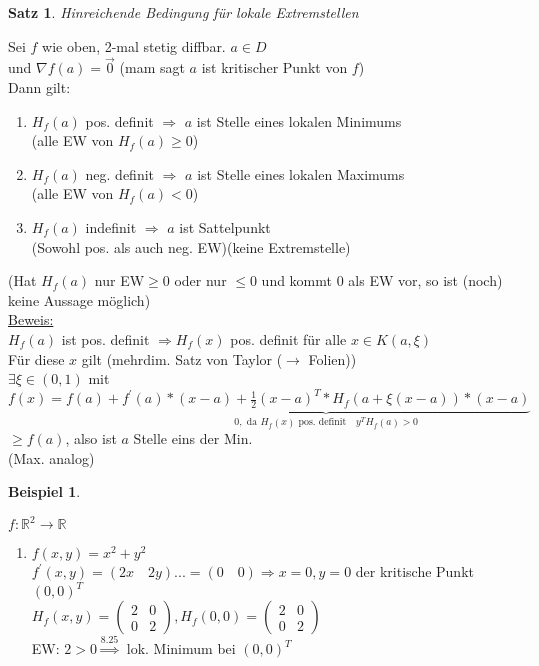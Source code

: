 \documentclass[a4paper,11pt]{article}
\newtheorem{satz}[definition]{Satz}
\newtheorem{bsp}[definition]{Beispiel}
\begin{document}
\begin{satz}
	Hinreichende Bedingung für lokale Extremstellen
\end{satz}
Sei $f$ wie oben, 2-mal stetig diffbar. $a\in D$ \\
und $\nabla f(a)=\overset{\rightarrow}{0}$ (mam sagt $a$ ist kritischer Punkt von $f$) \\
Dann gilt:
\begin{enumerate}[label=\alph*)]
	\item $H_f(a)$ pos. definit \hspace{15mm}$\Rightarrow$ $a$ ist Stelle eines lokalen Minimums \\
	(alle EW von $H_f(a)\geq0$)
	\item $H_f(a)$ neg. definit \hspace{15mm}$\Rightarrow$ $a$ ist Stelle eines lokalen Maximums \\
	(alle EW von $H_f(a)<0$)
	\item $H_f(a)$ indefinit \hspace{35mm}$\Rightarrow$ $a$ ist Sattelpunkt \\
	(Sowohl pos. als auch neg. EW)\hspace{13mm}(keine Extremstelle)
\end{enumerate}
(Hat $H_f(a)$ nur EW$\geq0$ oder nur $\leq0$ und kommt 0 als EW vor, so ist (noch) keine Aussage möglich) \\
\underline{Beweis:} \\
$H_f(a)$ ist pos. definit $\Rightarrow H_f(x)$ pos. definit für alle $x\in K(a,\xi)$ \\
Für diese $x$ gilt (mehrdim. Satz von Taylor ($\rightarrow$ Folien)) \\
$\exists\xi\in(0,1)$ mit $f(x)=f(a)+\underbrace{f^\prime(a)*(x-a)+\frac{1}{2}(x-a)^T*H_f(a+\xi(x-a))*(x-a)}_{0,\text{ da }H_f(x)\text{ pos. definit}\quad y^TH_f(a)>0}$ \\
$\geq f(a)$, also ist $a$ Stelle eins der Min. \\
(Max. analog) 

\newpage

\begin{bsp}
\end{bsp}
$f\colon\mathbb{R}^2\to\mathbb{R}$
\begin{enumerate}[label=\alph*)]
	\item $f(x,y)=x^2+y^2$ \\
	$f^\prime(x,y)=(2x\quad 2y)...=(0\quad0)\Rightarrow x=0,y=0$ der kritische Punkt $(0,0)^T$\\
	$H_f(x,y)=\begin{pmatrix}2&0\\0&2\end{pmatrix},H_f(0,0)=\begin{pmatrix}2&0\\0&2\end{pmatrix}$ \\
	EW: $2>0\overset{8.25}{\Rightarrow}$ lok. Minimum bei $(0,0)^T$
\end{enumerate}
\end{document}
